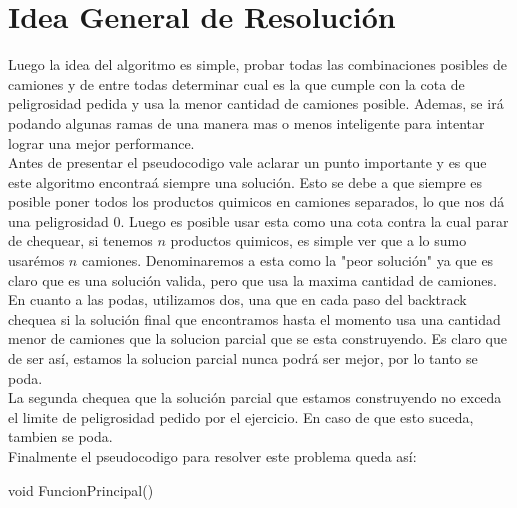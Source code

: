 \section{Idea General de Resoluci\'on}
Luego la idea del algoritmo es simple, probar todas las combinaciones posibles de camiones y de entre todas determinar cual es la que cumple con la cota de peligrosidad pedida y usa la menor cantidad de camiones posible. Ademas, se ir\'a podando algunas ramas de una manera mas o menos inteligente para intentar lograr una mejor performance.
\\
Antes de presentar el pseudocodigo vale aclarar un punto importante y es que este algoritmo encontra\'a siempre una soluci\'on. Esto se debe a que siempre es posible poner todos los productos quimicos en camiones separados, lo que nos d\'a  una peligrosidad $0$. Luego es posible usar esta como una cota contra la cual parar de chequear, si tenemos $n$ productos quimicos, es simple ver que a lo sumo usar\'emos $n$ camiones. Denominaremos a esta como la "peor soluci\'on" ya que es claro que es una soluci\'on valida, pero que usa la maxima cantidad de camiones.
\\
En cuanto a las podas, utilizamos dos, una que en cada paso del backtrack chequea si la soluci\'on final que encontramos hasta el momento usa una cantidad menor de camiones que la solucion parcial que se esta construyendo. Es claro que de ser as\'i, estamos la solucion parcial nunca podr\'a ser mejor, por lo tanto se poda.
\\
La segunda chequea que la soluci\'on parcial que estamos construyendo no exceda el limite de peligrosidad pedido por el ejercicio. En caso de que esto suceda, tambien se poda.
\\
Finalmente el pseudocodigo para resolver este problema queda as\'i:

\begin{algorithm}
\begin{algorithmic}[1]\parskip=1mm
\caption{void FuncionPrincipal()}

  
  
  
 
 \end{algorithmic}
\end{algorithm}

